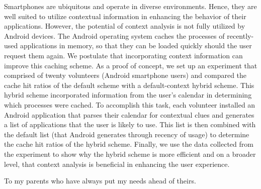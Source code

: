 \documentclass[12pt]{uthesis-v12}  %
\begin{document}

\begin{abstractpage}
	Smartphones are ubiquitous and operate in diverse environments. Hence, they are well suited to utilize contextual information in enhancing the behavior of their applications. However, the potential of context analysis is not fully utilized by Android devices. The Android operating system caches the processes of recently-used applications in memory, so that they can be loaded quickly should the user request them again. We postulate that incorporating context information can improve this caching scheme. As a proof of concept, we set up an experiment that comprised of twenty volunteers (Android smartphone users) and compared the cache hit ratios of the default scheme with a default-context hybrid scheme. This hybrid scheme incorporated information from the user's calendar in determining which processes were cached.  To accomplish this task, each volunteer installed an Android application that parses their calendar for contextual clues and generates a list of applications that the user is likely to use. This list is then combined with the default list (that Android generates through recency of usage) to determine the cache hit ratios of the hybrid scheme. Finally, we use the data collected from the experiment to show why the hybrid scheme is more efficient and on a broader level, that context analysis is beneficial in enhancing the user experience.        
\end{abstractpage}


\begin{dedication}
\noindent To my parents who have always put my needs ahead of theirs.
\end{dedication}
\end{document}
